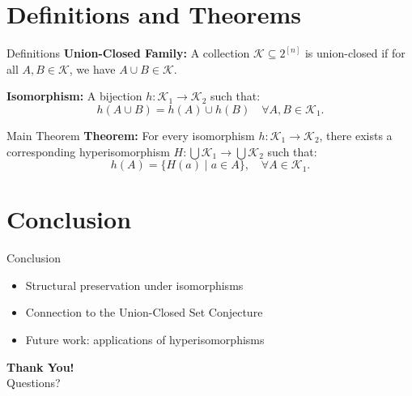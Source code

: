 \documentclass{beamer}
\begin{document}
\section{Definitions and Theorems}
\begin{frame}{Definitions}
	\textbf{Union-Closed Family:} A collection $\mathcal{K} \subseteq 2^{[n]}$ is union-closed if for all $A, B \in \mathcal{K}$, we have $A \cup B \in \mathcal{K}$.

	\vspace{1em}
	\textbf{Isomorphism:} A bijection $h: \mathcal{K}_1 \to \mathcal{K}_2$ such that:
	\begin{equation*}
		h(A \cup B) = h(A) \cup h(B) \quad \forall A, B \in \mathcal{K}_1.
	\end{equation*}
\end{frame}

\begin{frame}{Main Theorem}
	\textbf{Theorem:} For every isomorphism $h: \mathcal{K}_1 \to \mathcal{K}_2$, there exists a corresponding hyperisomorphism $H: \bigcup \mathcal{K}_1 \to \bigcup \mathcal{K}_2$ such that:
	\begin{equation*}
		h(A) = \{H(a) \mid a \in A\}, \quad \forall A \in \mathcal{K}_1.
	\end{equation*}
\end{frame}

\section{Conclusion}
\begin{frame}{Conclusion}
	\begin{itemize}
		\item Structural preservation under isomorphisms
		\item Connection to the Union-Closed Set Conjecture
		\item Future work: applications of hyperisomorphisms
	\end{itemize}
\end{frame}

\begin{frame}
	\centering
	{\Huge \textbf{Thank You!}}
	\\ Questions?
\end{frame}
\end{document}
